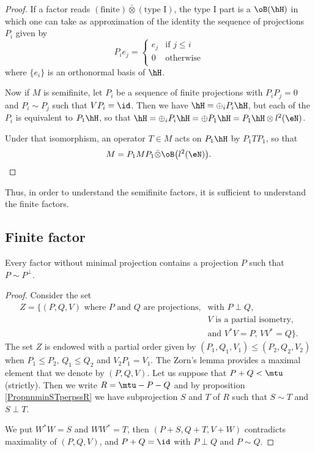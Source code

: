 \begin{proof}
If a factor reads $(\text{finite})\bar\otimes (\text{type I})$, the type I part is a $\oB(\hH)$ in which one can take as approximation of the identity the sequence of projections $P_i$ given by 
\begin{equation}
P_ie_j=
\begin{cases}
e_j	&\text{if $j\leq i$}\\
0	&\text{otherwise}\\
\end{cases}
\end{equation}
where $\{ e_i \}$ is an orthonormal basis of $\hH$.

Now if $M$ is semifinite, let $P_i$ be a sequence of finite projections with $P_iP_j=0$ and $P_i\sim P_j$ such that $VP_i=\id$. Then we have $\hH=\oplus_iP_i\hH$, but each of the $P_i$ is equivalent to $P_1\hH$, so that $\hH=\oplus_iP_i\hH=\oplus P_1\hH=P_1\hH\otimes l^2(\eN)$.

Under that isomorphism, an operator $T\in M$ acts on $P_1\hH$ by $P_1TP_1$, so that
\begin{equation}
M=P_1MP_1\bar\otimes \oB\big( l^2(\eN) \big).
\end{equation}

\end{proof}
Thus, in order to understand the semifinite factors, it is sufficient to understand the finite factors.

					\subsection{Finite factor}

\begin{lemma}		\label{LemfassminPPperp}
Every factor without minimal projection contains a projection $P$ such that $P\sim P^{\perp}$.
\end{lemma}

\begin{proof}
Consider the set
\[ 
\begin{split}
  Z=\Big\{ 
(P,Q,V)\text{ where $P$ and $Q$ are projections,}&\text{with $P\perp Q$,}\\
						&\text{$V$ is a partial isometry,}\\
						 &\text{and $V^*V=P$, $VV^*=Q$}
 \Big\}.
\end{split}
\]
The set $Z$ is endowed with a partial order given by $(P_1,Q_1,V_1)\leq (P_2,Q_2,V_2)$ when $P_1\leq P_2$, $Q_1\leq Q_2$ and $V_2P_1=V_1$. The Zorn's lemma provides a maximal element that we denote by $(P,Q,V)$. Let us suppose that $P+Q<\mtu$ (strictly). Then we write $R=\mtu-P-Q$ and by proposition \ref{PropnnminSTperpssR} we have subprojection $S$ and $T$ of $R$ such that $S\sim T$ and $S\perp T$. 

We put $W^*W=S$ and $WW^*=T$, then $(P+S,Q+T,V+W)$ contradicts maximality of $(P,Q,V)$, and $P+Q=\id$ with $P\perp Q$ and $P\sim Q$.
\end{proof}

